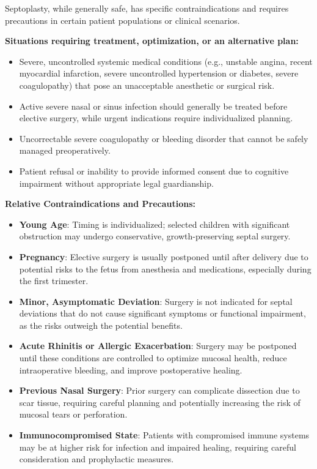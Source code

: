 Septoplasty, while generally safe, has specific contraindications and requires precautions in certain patient populations or clinical scenarios.

\textbf{Situations requiring treatment, optimization, or an alternative plan:}
\begin{itemize}
  \item Severe, uncontrolled systemic medical conditions (e.g., unstable angina, recent myocardial infarction, severe uncontrolled hypertension or diabetes, severe coagulopathy) that pose an unacceptable anesthetic or surgical risk.
  \item Active severe nasal or sinus infection should generally be treated before elective surgery, while urgent indications require individualized planning.
  \item Uncorrectable severe coagulopathy or bleeding disorder that cannot be safely managed preoperatively.
  \item Patient refusal or inability to provide informed consent due to cognitive impairment without appropriate legal guardianship.
\end{itemize}

\textbf{Relative Contraindications and Precautions:}
\begin{itemize}
  \item \textbf{Young Age}: Timing is individualized; selected children with significant obstruction may undergo conservative, growth-preserving septal surgery.
  \item \textbf{Pregnancy}: Elective surgery is usually postponed until after delivery due to potential risks to the fetus from anesthesia and medications, especially during the first trimester.
  \item \textbf{Minor, Asymptomatic Deviation}: Surgery is not indicated for septal deviations that do not cause significant symptoms or functional impairment, as the risks outweigh the potential benefits.
  \item \textbf{Acute Rhinitis or Allergic Exacerbation}: Surgery may be postponed until these conditions are controlled to optimize mucosal health, reduce intraoperative bleeding, and improve postoperative healing.
  \item \textbf{Previous Nasal Surgery}: Prior surgery can complicate dissection due to scar tissue, requiring careful planning and potentially increasing the risk of mucosal tears or perforation.
  \item \textbf{Immunocompromised State}: Patients with compromised immune systems may be at higher risk for infection and impaired healing, requiring careful consideration and prophylactic measures.
\end{itemize}

